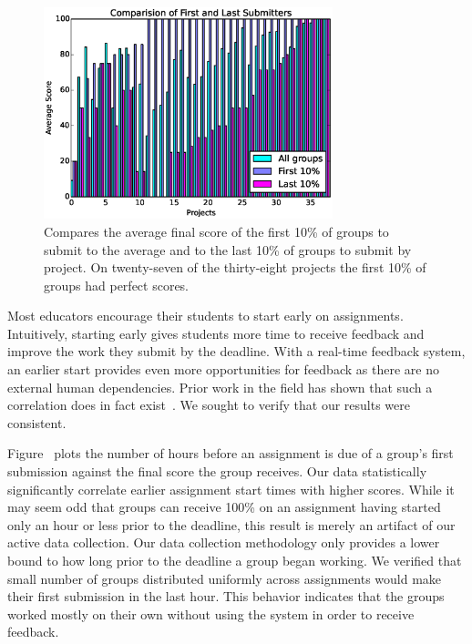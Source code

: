 \begin{figure}[!t]
\centering \includegraphics[width=3.3in]{graphs/Comparision_of_First_and_Last_Submitters.eps}
\caption{Compares the average final score of the first 10\% of groups to submit
  to the average and to the last 10\% of groups to submit by project. On
  twenty-seven of the thirty-eight projects the first 10\% of groups had
  perfect scores.}
\end{figure}

Most educators encourage their students to start early on
assignments. Intuitively, starting early gives students more time to receive
feedback and improve the work they submit by the deadline. With a real-time
feedback system, an earlier start provides even more opportunities for feedback
as there are no external human dependencies. Prior work in the field has shown
that such a correlation does in fact
exist~\cite{Spacco:2013:TIP:2462476.2465594,
  Edwards:2009:CEI:1584322.1584325}. We sought to verify that our results were
consistent.

Figure~ plots the number of hours before an
assignment is due of a group's first submission against the final score the
group receives. Our data statistically significantly correlate earlier
assignment start times with higher scores. While it may seem odd that groups
can receive 100\% on an assignment having started only an hour or less prior to
the deadline, this result is merely an artifact of our active data
collection. Our data collection methodology only provides a lower bound to how
long prior to the deadline a group began working. We verified that small number
of groups distributed uniformly across assignments would make their first
submission in the last hour. This behavior indicates that the groups worked
mostly on their own without using the system in order to receive feedback.


